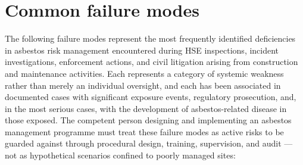 \section{Common failure modes}

The following failure modes represent the most frequently identified deficiencies in asbestos risk management encountered during HSE inspections, incident investigations, enforcement actions, and civil litigation arising from construction and maintenance activities. Each represents a category of systemic weakness rather than merely an individual oversight, and each has been associated in documented cases with significant exposure events, regulatory prosecution, and, in the most serious cases, with the development of asbestos-related disease in those exposed. The competent person designing and implementing an asbestos management programme must treat these failure modes as active risks to be guarded against through procedural design, training, supervision, and audit — not as hypothetical scenarios confined to poorly managed sites:

